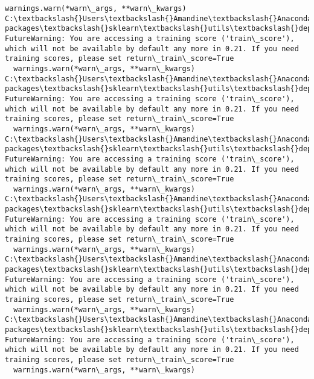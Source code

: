 \documentclass[11pt]{article}
\begin{document}
\begin{Verbatim}[commandchars=\\\{\}]
  warnings.warn(*warn\_args, **warn\_kwargs)
C:\textbackslash{}Users\textbackslash{}Amandine\textbackslash{}Anaconda3\textbackslash{}lib\textbackslash{}site-packages\textbackslash{}sklearn\textbackslash{}utils\textbackslash{}deprecation.py:122: FutureWarning: You are accessing a training score ('train\_score'), which will not be available by default any more in 0.21. If you need training scores, please set return\_train\_score=True
  warnings.warn(*warn\_args, **warn\_kwargs)
C:\textbackslash{}Users\textbackslash{}Amandine\textbackslash{}Anaconda3\textbackslash{}lib\textbackslash{}site-packages\textbackslash{}sklearn\textbackslash{}utils\textbackslash{}deprecation.py:122: FutureWarning: You are accessing a training score ('train\_score'), which will not be available by default any more in 0.21. If you need training scores, please set return\_train\_score=True
  warnings.warn(*warn\_args, **warn\_kwargs)
C:\textbackslash{}Users\textbackslash{}Amandine\textbackslash{}Anaconda3\textbackslash{}lib\textbackslash{}site-packages\textbackslash{}sklearn\textbackslash{}utils\textbackslash{}deprecation.py:122: FutureWarning: You are accessing a training score ('train\_score'), which will not be available by default any more in 0.21. If you need training scores, please set return\_train\_score=True
  warnings.warn(*warn\_args, **warn\_kwargs)
C:\textbackslash{}Users\textbackslash{}Amandine\textbackslash{}Anaconda3\textbackslash{}lib\textbackslash{}site-packages\textbackslash{}sklearn\textbackslash{}utils\textbackslash{}deprecation.py:122: FutureWarning: You are accessing a training score ('train\_score'), which will not be available by default any more in 0.21. If you need training scores, please set return\_train\_score=True
  warnings.warn(*warn\_args, **warn\_kwargs)
C:\textbackslash{}Users\textbackslash{}Amandine\textbackslash{}Anaconda3\textbackslash{}lib\textbackslash{}site-packages\textbackslash{}sklearn\textbackslash{}utils\textbackslash{}deprecation.py:122: FutureWarning: You are accessing a training score ('train\_score'), which will not be available by default any more in 0.21. If you need training scores, please set return\_train\_score=True
  warnings.warn(*warn\_args, **warn\_kwargs)
C:\textbackslash{}Users\textbackslash{}Amandine\textbackslash{}Anaconda3\textbackslash{}lib\textbackslash{}site-packages\textbackslash{}sklearn\textbackslash{}utils\textbackslash{}deprecation.py:122: FutureWarning: You are accessing a training score ('train\_score'), which will not be available by default any more in 0.21. If you need training scores, please set return\_train\_score=True
  warnings.warn(*warn\_args, **warn\_kwargs)

    \end{Verbatim}
\end{document}
